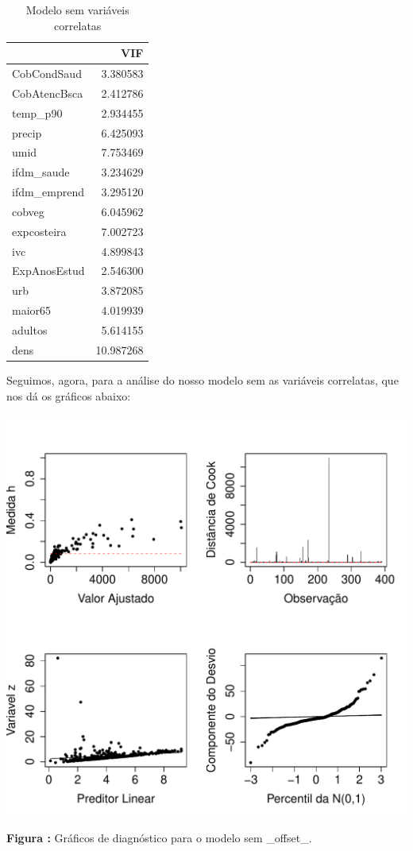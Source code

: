 \documentclass[12pt,a4paper]{article}\usepackage[]{graphicx}\usepackage[]{color}
\makeatletter
\def\maxwidth{ %
  \ifdim\Gin@nat@width>\linewidth
    \linewidth
  \else
    \Gin@nat@width
  \fi
}
\newenvironment{knitrout}{}{} %
\makeatother
\begin{document}
\begin{knitrout}
\begin{table}[H]
\caption{\label{tab:unnamed-chunk-7}Modelo sem variáveis correlatas}
\centering
\begin{tabular}[t]{l|r}
\hline
  & VIF\\
\hline
CobCondSaud & 3.380583\\
\hline
CobAtencBsca & 2.412786\\
\hline
temp\_p90 & 2.934455\\
\hline
precip & 6.425093\\
\hline
umid & 7.753469\\
\hline
ifdm\_saude & 3.234629\\
\hline
ifdm\_emprend & 3.295120\\
\hline
cobveg & 6.045962\\
\hline
expcosteira & 7.002723\\
\hline
ivc & 4.899843\\
\hline
ExpAnosEstud & 2.546300\\
\hline
urb & 3.872085\\
\hline
maior65 & 4.019939\\
\hline
adultos & 5.614155\\
\hline
dens & 10.987268\\
\hline
\end{tabular}
\end{table}


\end{knitrout}

Seguimos, agora, para a análise do nosso modelo sem as variáveis correlatas, que nos dá os gráficos abaixo:

\begin{knitrout}
\color{fgcolor}
\includegraphics[width=\maxwidth]{figure/unnamed-chunk-8-1} 

\end{knitrout}
\textbf{Figura :} Gráficos de diagnóstico para o modelo sem \_offset\_.
\end{document}
